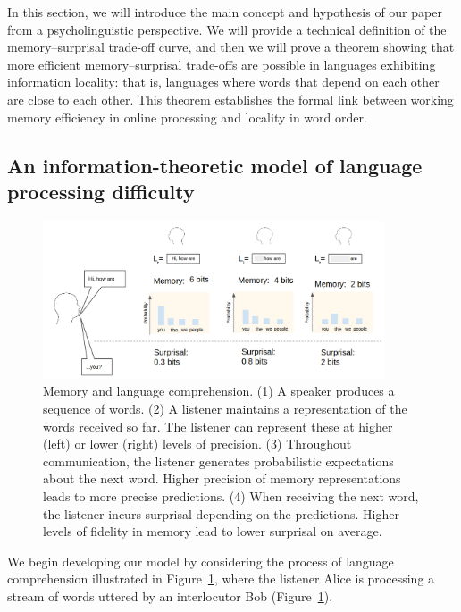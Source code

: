 In this section, we will introduce the main concept and hypothesis of our paper from a psycholinguistic perspective. We will provide a technical definition of the memory--surprisal trade-off curve, and then we will prove a theorem showing that more efficient memory--surprisal trade-offs are possible in languages exhibiting information locality: that is, languages where words that depend on each other are close to each other. This theorem establishes the formal link between working memory efficiency in online processing and locality in word order.

\subsection{An information-theoretic model of language processing difficulty}

\begin{figure}
\centering
\includegraphics[width=0.9\textwidth]{figures-gdrive/communication.png}
	\caption{Memory and language comprehension. (1) A speaker produces a sequence of words. (2) A listener maintains a representation of the words received so far. The listener can represent these at higher (left) or lower (right) levels of precision. (3) Throughout communication, the listener generates probabilistic expectations about the next word. Higher precision of memory representations leads to more precise predictions. (4) When receiving the next word, the listener incurs surprisal depending on the predictions. Higher levels of fidelity in memory lead to lower surprisal on average.  }
	\label{fig:communication}
\end{figure}

We begin developing our model by considering the process of language comprehension illustrated in Figure~\ref{fig:communication}, where the listener Alice is processing a stream of words uttered by an interlocutor Bob (Figure~\ref{fig:communication}). 

